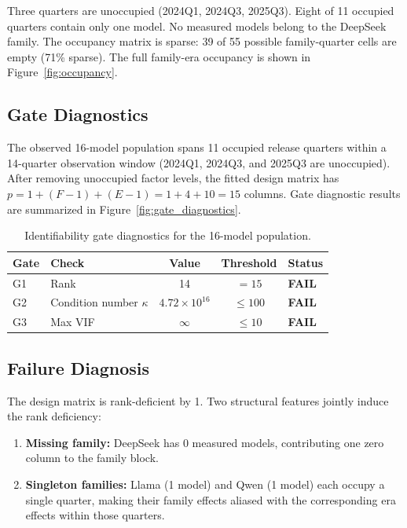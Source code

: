 \documentclass[journal]{IEEEtran}
\begin{document}
Three quarters are unoccupied (2024Q1, 2024Q3, 2025Q3). Eight of 11 occupied quarters contain only one model. No measured models belong to the DeepSeek family. The occupancy matrix is sparse: 39 of 55 possible family-quarter cells are empty (71\% sparse). The full family-era occupancy is shown in Figure~\ref{fig:occupancy}.

\subsection{Gate Diagnostics}

The observed 16-model population spans 11 occupied release quarters within a 14-quarter observation window (2024Q1, 2024Q3, and 2025Q3 are unoccupied). After removing unoccupied factor levels, the fitted design matrix has $p = 1 + (F-1) + (E-1) = 1 + 4 + 10 = 15$ columns. Gate diagnostic results are summarized in Figure~\ref{fig:gate_diagnostics}.

\begin{table}[!t]
\centering
\caption{Identifiability gate diagnostics for the 16-model population.}
\label{tab:gate_diag}
\begin{tabular}{llccl}
\toprule
Gate & Check & Value & Threshold & Status \\
\midrule
G1 & Rank & 14 & $= 15$ & \textbf{FAIL} \\
G2 & Condition number $\kappa$ & $4.72 \times 10^{16}$ & $\leq 100$ & \textbf{FAIL} \\
G3 & Max VIF & $\infty$ & $\leq 10$ & \textbf{FAIL} \\
\bottomrule
\end{tabular}
\end{table}

\subsection{Failure Diagnosis}

The design matrix is rank-deficient by 1. Two structural features jointly induce the rank deficiency:
\begin{enumerate}[nosep]
\item \textbf{Missing family:} DeepSeek has 0 measured models, contributing one zero column to the family block.
\item \textbf{Singleton families:} Llama (1 model) and Qwen (1 model) each occupy a single quarter, making their family effects aliased with the corresponding era effects within those quarters.
\end{enumerate}
\end{document}
